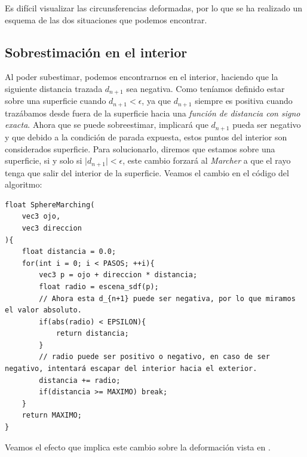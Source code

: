 Es difícil visualizar las circunsferencias deformadas, por lo que se ha realizado un esquema de las dos situaciones que podemos encontrar. 

\subsection{Sobrestimación en el interior}
Al poder subestimar, podemos encontrarnos en el interior, haciendo que la siguiente distancia trazada \(d_{n+1}\) sea negativa. Como teníamos definido estar sobre una superficie cuando \(d_{n+1}<\epsilon\), ya que \(d_{n+1}\) siempre es positiva cuando trazábamos desde fuera de la superficie  hacia una \textit{función de distancia con signo exacta}. Ahora que se puede sobreestimar, implicará que \(d_{n+1}\) pueda ser negativo y que debido a la condición de parada expuesta, estos puntos del interior son considerados superficie. Para solucionarlo, diremos que estamos sobre una superficie, si y solo si \( \vert d_{n+1} \vert < \epsilon\), este cambio forzará al \textit{Marcher} a que el rayo tenga que salir del interior de la superficie. Veamos el cambio en el código del algoritmo: 
\begin{lstlisting}
float SphereMarching(
    vec3 ojo, 
    vec3 direccion
){
    float distancia = 0.0;
    for(int i = 0; i < PASOS; ++i){
        vec3 p = ojo + direccion * distancia;
        float radio = escena_sdf(p);
        // Ahora esta d_{n+1} puede ser negativa, por lo que miramos el valor absoluto. 
        if(abs(radio) < EPSILON){
            return distancia;
        }
        // radio puede ser positivo o negativo, en caso de ser negativo, intentará escapar del interior hacia el exterior.
        distancia += radio;
        if(distancia >= MAXIMO) break;
    }
    return MAXIMO;
}
\end{lstlisting}
Veamos el efecto que implica este cambio sobre la deformación vista en .

